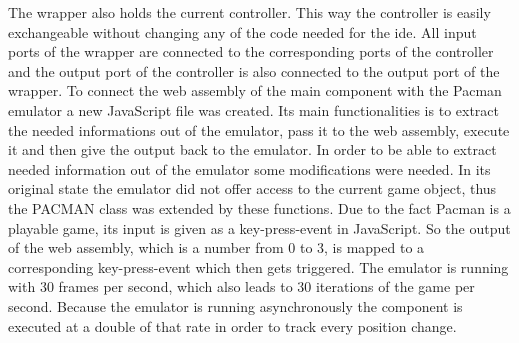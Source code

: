 The wrapper also holds the current controller. This way the controller is easily exchangeable without changing any of the code needed for the ide. All input ports of the wrapper are connected to the corresponding ports of the controller and the output port of the controller is also connected to the output port of the wrapper. \newline
To connect the web assembly of the main component with the Pacman emulator a new JavaScript file was created. Its main functionalities is to extract the needed informations out of the emulator, pass it to the web assembly, execute it and then give the output back to the emulator. In order to be able to extract needed information out of the emulator some modifications were needed. In its original state the emulator did not offer access to the current game object, thus the PACMAN class was extended by these functions. Due to the fact Pacman is a playable game, its input is given as a key-press-event in JavaScript. So the output of the web assembly, which is a number from 0 to 3, is mapped to a corresponding key-press-event which then gets triggered. The emulator is running with 30 frames per second, which also leads to 30 iterations of the game per second. Because the emulator is running asynchronously the component is executed at a double of that rate in order to track every position change.

